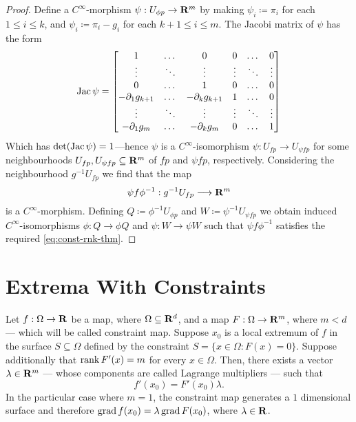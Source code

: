 \begin{proof}
Define a \(C^{\infty}\)-morphism \(\psi: U_{\phi p} \to \mathbf{R}^m\) by making
\(\psi_i \coloneq \pi_i\) for each \(1 \leq i \leq k\), and
\(\psi_i \coloneq \pi_i - g_i\) for each \(k+1 \leq i \leq m\). The Jacobi
matrix of \(\psi\) has the form
\[
\operatorname{Jac} \psi =
\begin{bmatrix}
  1                &\dots  &0
  &0               &\dots  &0
  \\
  \vdots           &\ddots &\vdots
  &\vdots          &\ddots &\vdots
  \\
  0                &\dots  &1
  &0               &\dots  &0
  \\
  -\partial_1 g_{k+1} &\dots  &-\partial_k g_{k+1}
  &1 &\dots  &0
  \\
  \vdots           &\ddots &\vdots
  &\vdots &\ddots &\vdots
  \\
  -\partial_1 g_m &\dots  &-\partial_k g_m
  &0 &\dots &1
\end{bmatrix}
\]
Which has \(\det(\operatorname{Jac} \psi) = 1\)---hence \(\psi\) is a
\(C^{\infty}\)-isomorphism \(\psi: U_{f p} \to U_{\psi f p}\) for some
neighbourhoods \(U_{f p}, U_{\psi f p} \subseteq \mathbf{R}^m\) of \(f p\) and
\(\psi f p\), respectively. Considering the neighbourhood \(g^{-1} U_{f p}\) we
find that the map
\[
\psi f \phi^{-1}: g^{-1} U_{f p} \longrightarrow \mathbf{R}^m
\]
is a \(C^{\infty}\)-morphism. Defining \(Q \coloneq \phi^{-1} U_{\phi p}\) and
\(W \coloneq \psi^{-1} U_{\psi f p}\) we obtain induced
\(C^{\infty}\)-isomorphisms \(\phi: Q \to \phi Q\) and \(\psi: W \to \psi W\)
such that \(\psi f \phi^{-1}\) satisfies the required \cref{eq:const-rnk-thm}.
\end{proof}

\section{Extrema With Constraints}

\begin{theorem}
\label{thm:existence-lagrange-multipliers}
Let \(f: \Omega \to \mathbf{R}\) be a map, where \(\Omega \subseteq \mathbf{R}^d\), and a map
\(F: \Omega \to \mathbf{R}^m\), where \(m < d\) --- which will be called constraint
map. Suppose \(x_0\) is a local extremum of \(f\) in the surface
\(S \subseteq \Omega\) defined by the constraint
\(S = \{x \in \Omega \colon F(x) = 0\}\). Suppose additionally that
\(\operatorname{rank} F'(x) = m\) for every \(x \in \Omega\). Then, there exists a vector
\(\lambda \in \mathbf{R}^m\) --- whose components are called Lagrange multipliers ---
such that
\[
  f'(x_0) = F'(x_0) \lambda.
\]
In the particular case where \(m = 1\), the constraint map generates a \(1\)
dimensional surface and therefore \(\operatorname{grad} f(x_0) = \lambda \operatorname{grad} F(x_0)\), where
\(\lambda \in \mathbf{R}\).
\end{theorem}

